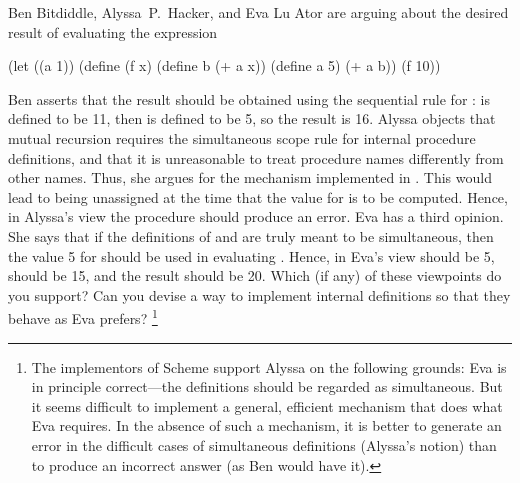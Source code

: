 \begin{exercise}
	\label{Exercise 4.19}
	Ben Bitdiddle, Alyssa~P.~Hacker, and Eva Lu Ator are arguing about the desired result of evaluating the expression
	\begin{scheme}
	  (let ((a 1))
	    (define (f x)
	      (define b (+ a x))
	      (define a 5)
	      (+ a b))
	    (f 10))
	\end{scheme}
	Ben asserts that the result should be obtained using the sequential rule for :
	 is defined to be 11, then  is defined to be 5, so the result is 16.
	Alyssa objects that mutual recursion requires the simultaneous scope rule for internal procedure definitions, and that it is unreasonable to treat procedure names differently from other names.
	Thus, she argues for the mechanism implemented in .
	This would lead to  being unassigned at the time that the value for  is to be computed.
	Hence, in Alyssa’s view the procedure should produce an error.
	Eva has a third opinion.
	She says that if the definitions of  and  are truly meant to be simultaneous, then the value 5 for  should be used in evaluating .
	Hence, in Eva’s view  should be 5,  should be 15, and the result should be 20.
	Which (if any) of these viewpoints do you support?
	Can you devise a way to implement internal definitions so that they behave as Eva prefers?%
	\footnote{
		The  implementors of Scheme support Alyssa on the following grounds:
		Eva is in principle correct---the definitions should be regarded as simultaneous.
		But it seems difficult to implement a general, efficient mechanism that does what Eva requires.
		In the absence of such a mechanism, it is better to generate an error in the difficult cases of simultaneous definitions (Alyssa’s notion) than to produce an incorrect answer (as Ben would have it).
	}
\end{exercise}



